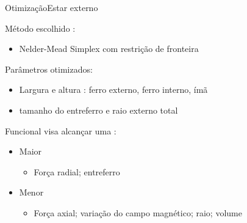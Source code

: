 \documentclass{beamer}
\begin{document}
\begin{frame}{Otimização}{Estar externo}

Método escolhido :
\begin{itemize}
	\item Nelder-Mead Simplex com restrição de fronteira
\end{itemize}

Parâmetros otimizados:
\begin{itemize}
	\item Largura e altura : ferro externo, ferro interno, ímã
	\item tamanho do entreferro e raio externo total
\end{itemize}

Funcional visa alcançar uma :
\begin{itemize}
	\item Maior
		\begin{itemize}
		\item Força radial; entreferro
		\end{itemize}
	\item Menor
		\begin{itemize}
		\item Força axial; variação do campo magnético; raio; volume
		\end{itemize}
\end{itemize} 
\end{frame}

\end{document}

